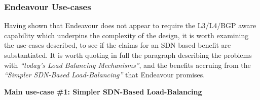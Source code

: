 


\subsubsection{Endeavour Use-cases}
Having shown that Endeavour does not appear to require the L3/L4/BGP aware capability which underpins the complexity of the design, it is worth examining the use-cases described, to see if the claims for an SDN based benefit are substantiated.
It is worth quoting in full the paragraph describing the problems with \emph{“today's Load Balancing Mechanisms”}, and the benefits accruing from the \emph{“Simpler SDN-Based Load-Balancing”} that Endeavour promises.













\textbf{Main use-case \#1: Simpler SDN-Based Load-Balancing}


